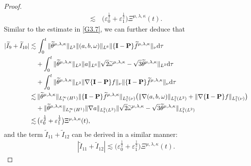\documentclass[reqno,11pt]{amsart}
\theoremstyle{plain}
\numberwithin{equation}{section}
\newcommand{\eps}{{\varepsilon}}
\begin{document}
\begin{proof}
\begin{align}
 \lesssim&\, \big(\eps_0^\frac{1}{2}+\eps_1^\frac{1}{2}\big){\Xi} ^{\mu,\lambda,\kappa}(t).    
\end{align}
Similar to the estimate    in \eqref{G3.7}, we can further deduce that  
\begin{align}\label{G4.11}
|\widetilde{I}_9+\widetilde{I}_{10}|    \lesssim&\, \int_0^t \|\widetilde\theta^{\mu,\lambda,\kappa}\|_{L^3}\|(a,b,\omega)\|_{L^6}\|\{\mathbf{I}-\mathbf{P}\}\widetilde{f}^{\mu,\lambda,\kappa}\|_{\nu}{\rm d}\tau\nonumber\\
&+\int_0^t\|\widetilde\theta^{\mu,\lambda,\kappa}\|_{L^3}\| a\|_{L^6}\|\sqrt{2}\widetilde\omega^{\mu,\lambda,\kappa}-\sqrt{3}\widetilde\theta^{\mu,\lambda,\kappa}\|_{L^2} {\rm d}\tau\nonumber\\
&+\int_0^t\|\widetilde\theta^{\mu,\lambda,\kappa}\|_{L^3}\|\nabla\{\mathbf{I}-\mathbf{P}\}f\|_{\nu}\|\{\mathbf{I}-\mathbf{P}\}\widetilde{f}^{\mu,\lambda,\kappa}\|_{\nu}{\rm d}\tau\nonumber\\
\lesssim&\, \|\widetilde{\theta}^{\mu,\lambda,\kappa}\|_{L_t^\infty(H^1)}\|\{\mathbf{I}-\mathbf{P}\}\widetilde{f}^{\mu,\lambda,\kappa}\|_{L_t^2(\nu)}\big(\|\nabla(a,b,\omega)\|_{L_t^2(L^2)}+\|\nabla\{\mathbf{I}-\mathbf{P}\} {f} \|_{L_t^2(\nu)}   \big)\nonumber\\
&+\|\widetilde{\theta}^{\mu,\lambda,\kappa}\|_{L_t^\infty(H^1)}\|\nabla a\|_{L_t^2(L^2)}\|\sqrt{2}\widetilde\omega^{\mu,\lambda,\kappa}-\sqrt{3}\widetilde\theta^{\mu,\lambda,\kappa}\|_{L_t^2(L^2)}\nonumber\\
\lesssim&\, \big(\eps_0^\frac{1}{2}+\eps_1^\frac{1}{2}\big){\Xi} ^{\mu,\lambda,\kappa}(t),
\end{align}
and the term $\widetilde{I}_{11}+\widetilde{I}_{12}$ can be derived in a similar manner:
\begin{align}\label{G4.12}
|\widetilde{I}_{11}+\widetilde{I}_{12}|\lesssim  \big(\eps_0^\frac{1}{2}+\eps_1^\frac{1}{2}\big){\Xi} ^{\mu,\lambda,\kappa}(t).   
\end{align}


\end{proof}
\end{document}
